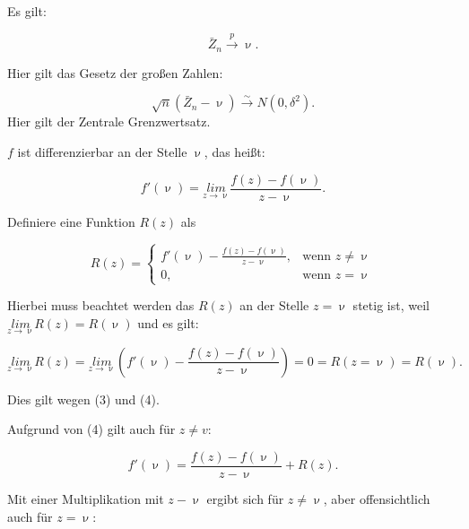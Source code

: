 \documentclass[10pt]{article}
\newcommand{\KW}{\overset{p} \longrightarrow} %
\newcommand{\KV}{\overset{\sim} \longrightarrow} %
\newcommand{\eqname}[1]{\tag*{#1}}%
\newenvironment{BWS}[1][]
{\begin{Beweis}[frametitle=#1]}{\end{Beweis}}
\begin{document}
	
	\begin{BWS}[Beweis 1.3.1 Delta-Methode]
		Es gilt:
		
		
		\begin{equation*}
			\bar{Z}_n \KW \upnu  \eqname{(1)}.
		\end{equation*}
		
		\noindent Hier gilt das Gesetz der großen Zahlen:
		
		\begin{equation*}
			\sqrt{n} (\bar{Z}_n - \upnu) \KV N(0,\delta^2) \eqname{(2)}.
		\end{equation*}
		Hier gilt der Zentrale Grenzwertsatz.
		
		$f$ ist differenzierbar an der Stelle $\upnu$, das heißt: 
		
		\begin{equation*}
			f'(\upnu) = \underset{z \rightarrow \upnu}{lim} \frac{f(z) - f(\upnu)}{z-\upnu} \eqname{(3)}.
		\end{equation*}
		
		\noindent Definiere eine Funktion $R(z)$ als
		
		\begin{equation*}
			R(z) = \begin{cases} 
				f'(\upnu) - \frac{f(z)- f(\upnu)}{z-\upnu}, &\text{wenn } z \neq \upnu\\
				0, &\text{wenn } z = \upnu
			\end{cases} \eqname{(4)}
		\end{equation*}
		
		\noindent Hierbei muss beachtet werden das $R(z)$ an der Stelle $z=\upnu$ stetig ist, weil $\underset{z \rightarrow \upnu} {lim} R(z) = R(\upnu)$ und es gilt:
		
		\begin{equation*}
			\underset{z \rightarrow \upnu} {lim} R(z) = \underset{z \rightarrow \upnu}{lim} ( f'(\upnu) - \frac{f(z)-f(\upnu)}{z-\upnu} ) = 0 = R(z = \upnu) = R(\upnu).
		\end{equation*}
		
		\noindent Dies gilt wegen (3) und (4).
		
		\noindent Aufgrund von (4) gilt auch für $z \neq v$:
		
		\begin{equation*}
			f'(\upnu)=\frac{f(z) - f(\upnu)}{z - \upnu} + R(z).
		\end{equation*}
		
		Mit einer Multiplikation mit $z-\upnu$ ergibt sich für $z \neq \upnu$, aber offensichtlich auch für $z = \upnu$:
		

\end{BWS}
\end{document}
